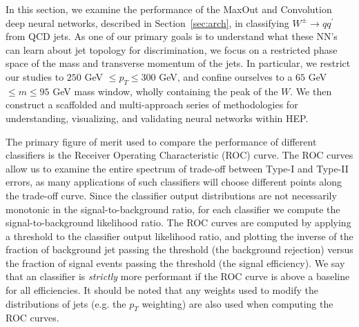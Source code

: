 
In this section, we examine the performance of the MaxOut and Convolution deep neural networks, described in Section~\ref{sec:arch}, in classifying $W^\pm \to q q^\prime$ from QCD jets.  As one of our primary goals is to understand  what these NN's can learn about jet topology for discrimination, we focus on a restricted phase space of the mass and transverse momentum of the jets.  In particular, we restrict our studies to $250$ GeV $\leq p_T \leq 300$ GeV, and confine ourselves to a $65$ GeV $\leq m \leq 95$ GeV mass window, wholly containing the peak of the $W$.   We then construct a scaffolded and multi-approach series of methodologies for understanding, visualizing, and validating neural networks within HEP.

The primary figure of merit used to compare the performance of different classifiers is the Receiver Operating Characteristic (ROC) curve.  The ROC curves allow us to examine the entire spectrum of trade-off between Type-I and Type-II errors, as many applications of such classifiers will choose different points along the trade-off curve.   Since the classifier output distributions are not necessarily monotonic in the signal-to-background ratio, for each classifier we compute the  signal-to-background likelihood ratio.  The ROC curves are computed by applying a threshold to the classifier output likelihood ratio, and plotting the inverse of the fraction of background jet passing the threshold (the background rejection) versus the fraction of signal events passing the threshold (the signal efficiency).  We say that an classifier is \emph{strictly} more performant if the ROC curve is above a baseline for all efficiencies.  It should be noted that any weights used to modify the distributions of jets (e.g. the $p_{T}$ weighting) are also used when computing the ROC curves.

%

